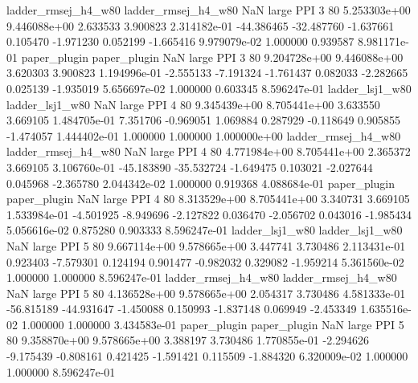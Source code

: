 ladder_rmsej_h4_w80 ladder_rmsej_h4_w80                   NaN      large      PPI                 3 80 5.253303e+00   9.446088e+00      2.633533       3.900823  2.314182e-01    -44.386465    -32.487760    -1.637661       0.105470 -1.971230   0.052199    -1.665416   9.979079e-02            1.000000        0.939587        8.981171e-01
       paper_plugin        paper_plugin                   NaN      large      PPI                 3 80 9.204728e+00   9.446088e+00      3.620303       3.900823  1.194996e-01     -2.555133     -7.191324    -1.761437       0.082033 -2.282665   0.025139    -1.935019   5.656697e-02            1.000000        0.603345        8.596247e-01
    ladder_lsj1_w80     ladder_lsj1_w80                   NaN      large      PPI                 4 80 9.345439e+00   8.705441e+00      3.633550       3.669105  1.484705e-01      7.351706     -0.969051     1.069884       0.287929 -0.118649   0.905855    -1.474057   1.444402e-01            1.000000        1.000000        1.000000e+00
ladder_rmsej_h4_w80 ladder_rmsej_h4_w80                   NaN      large      PPI                 4 80 4.771984e+00   8.705441e+00      2.365372       3.669105  3.106760e-01    -45.183890    -35.532724    -1.649475       0.103021 -2.027644   0.045968    -2.365780   2.044342e-02            1.000000        0.919368        4.088684e-01
       paper_plugin        paper_plugin                   NaN      large      PPI                 4 80 8.313529e+00   8.705441e+00      3.340731       3.669105  1.533984e-01     -4.501925     -8.949696    -2.127822       0.036470 -2.056702   0.043016    -1.985434   5.056616e-02            0.875280        0.903333        8.596247e-01
    ladder_lsj1_w80     ladder_lsj1_w80                   NaN      large      PPI                 5 80 9.667114e+00   9.578665e+00      3.447741       3.730486  2.113431e-01      0.923403     -7.579301     0.124194       0.901477 -0.982032   0.329082    -1.959214   5.361560e-02            1.000000        1.000000        8.596247e-01
ladder_rmsej_h4_w80 ladder_rmsej_h4_w80                   NaN      large      PPI                 5 80 4.136528e+00   9.578665e+00      2.054317       3.730486  4.581333e-01    -56.815189    -44.931647    -1.450088       0.150993 -1.837148   0.069949    -2.453349   1.635516e-02            1.000000        1.000000        3.434583e-01
       paper_plugin        paper_plugin                   NaN      large      PPI                 5 80 9.358870e+00   9.578665e+00      3.388197       3.730486  1.770855e-01     -2.294626     -9.175439    -0.808161       0.421425 -1.591421   0.115509    -1.884320   6.320009e-02            1.000000        1.000000        8.596247e-01
